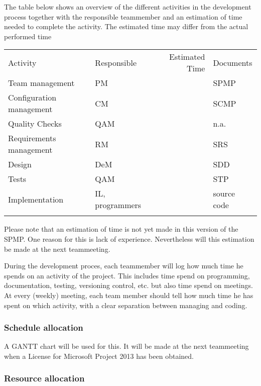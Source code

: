 \documentclass[9pt]{article}
\begin{document}
The table below shows an overview of the different activities in the
development process together with the responsible teammember and an
estimation of time needed to complete the activity. The estimated time
may differ from the actual performed time

\begin{longtable}[c]{@{}llrl@{}}
\hline\noalign{\medskip}
Activity & Responsible & Estimated Time & Documents
\\\noalign{\medskip}
\hline\noalign{\medskip}
Team management & PM & & SPMP
\\\noalign{\medskip}
Configuration management & CM & & SCMP
\\\noalign{\medskip}
Quality Checks & QAM & & n.a.
\\\noalign{\medskip}
Requirements management & RM & & SRS
\\\noalign{\medskip}
Design & DeM & & SDD
\\\noalign{\medskip}
Tests & QAM & & STP
\\\noalign{\medskip}
Implementation & IL, programmers & & source code
\\\noalign{\medskip}
\hline
\end{longtable}

Please note that an estimation of time is not yet made in this version
of the SPMP. One reason for this is lack of experience. Nevertheless
will this estimation be made at the next teammeeting.

During the development proces, each teammember will log how much time he
spends on an activity of the project. This includes time spend on
programming, documentation, testing, versioning control, etc. but also
time spend on meetings. At every (weekly) meeting, each team member
should tell how much time he has spent on which activity, with a clear
separation between managing and coding.

\subsubsection{Schedule allocation}\label{schedule-allocation}

A GANTT chart will be used for this. It will be made at the next
teammeeting when a License for Microsoft Project 2013 has been obtained.

\subsubsection{Resource allocation}\label{resource-allocation}
\end{document}
